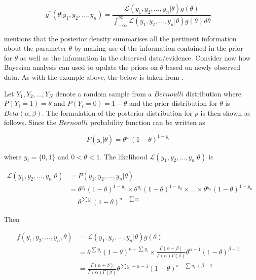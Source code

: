 \begin{equation}
    \label{eq:probability:bayesian_statistic:bayesian_analysis:posterior_density}
    g^{*}(\theta \vert y_{1}, y_{2}, \dots, y_{n}) = \frac{\mathcal{L}(y_{1}, y_{2}, \dots, y_{n} \vert \theta)g(\theta)}{\int_{-\infty}^{\infty} \mathcal{L}(y_{1}, y_{2}, \dots, y_{n} \vert \theta)g(\theta)d\theta}
\end{equation}

\citeauthor{ref:wackerly:2014}\cite{ref:wackerly:2014} mentions that the posterior density summarises all the pertinent information about the parameter $\theta$ by making use of the information contained in the prior for $\theta$ as well as the information in the observed data/evidence. Consider now how Bayesian analysis can used to update the priors on $\theta$ based on newly observed data. As with the example above, the below is taken from \cite{ref:wackerly:2014}.

Let $Y_{1}, Y_{2}, \dots, Y_{N}$ denote a random sample from a $Bernoulli$ distribution where $P(Y_{i} = 1) = \theta$ and $P(Y_{i} = 0) = 1 - \theta$ and the prior distribution for $\theta$ is $Beta(\alpha, \beta)$. The formulation of the posterior distribution for $p$ is then shown as follows. Since the $Bernoulli$ probability function can be written as 

\begin{equation*}
    P(y_{i} \vert \theta) = \theta^{y_{i}}(1 - \theta)^{1-y_{i}}
\end{equation*}

where $y_{i} = \{0,1\}$ and $0 < \theta < 1$. The likelihood $\mathcal{L}(y_{1}, y_{2}, \dots, y_{n} \vert \theta)$ is

\begin{equation*}
    \begin{split}
        \mathcal{L}(y_{1}, y_{2}, \dots, y_{n} \vert \theta)
        &= P(y_{1}, y_{2}, \dots, y_{n} \vert \theta)\\
        &= \theta^{y_{1}}(1-\theta)^{1 - y_{1}} \times \theta^{y_{2}}(1-\theta)^{1 - y_{2}} \times \dots \times \theta^{y_{n}}(1-\theta)^{1 - y_{n}}\\
        &= \theta^{\sum y_{i}}(1-\theta)^{n-\sum y_{i}}
    \end{split}
\end{equation*}

Then

\begin{equation*}
    \begin{split}
        f(y_{1}, y_{2}, \dots, y_{n}, \theta)
        &= \mathcal{L}(y_{1}, y_{2}, \dots, y_{n} \vert \theta)g(\theta)\\
        &= \theta^{\sum y_{i}}(1-\theta)^{n-\sum y_{i}} \times \frac{\Gamma(\alpha + \beta)}{\Gamma(\alpha)\Gamma(\beta)}\theta^{\alpha - 1}(1 - \theta)^{\beta  - 1}\\
        &= \frac{\Gamma(\alpha + \beta)}{\Gamma(\alpha)\Gamma(\beta)}\theta^{\sum y_{i} + \alpha - 1}(1-\theta)^{n - \sum y_{i} + \beta - 1}
    \end{split}
\end{equation*}


